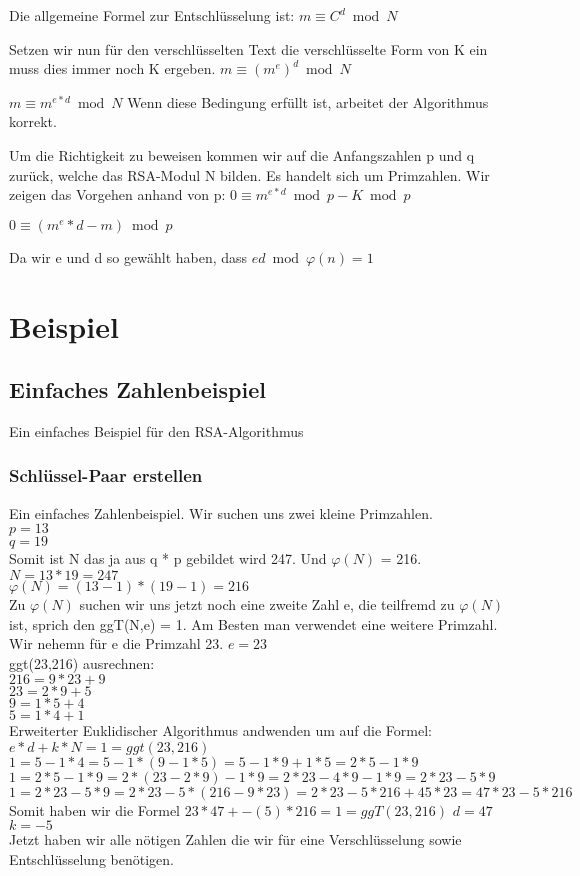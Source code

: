 
Die allgemeine Formel zur Entschlüsselung ist:
$ m \equiv C^d \bmod N $

Setzen wir nun für den verschlüsselten Text die verschlüsselte Form von K ein muss dies immer noch K ergeben.
$ m \equiv (m^e)^d \bmod N $

$ m \equiv m^{e*d} \bmod N $
Wenn diese Bedingung erfüllt ist, arbeitet der Algorithmus korrekt.

Um die Richtigkeit zu beweisen kommen wir auf die Anfangszahlen p und q zurück, welche das RSA-Modul N bilden. Es handelt sich um Primzahlen. Wir zeigen das Vorgehen anhand von p:
$ 0 \equiv m^{e*d} \bmod p - K \bmod p $

$ 0 \equiv (m^e*d-m) \bmod p $

Da wir e und d so gewählt haben, dass 
$ ed \bmod \varphi(n) = 1 $ 


\section{Beispiel}
\subsection{Einfaches Zahlenbeispiel}
Ein einfaches Beispiel für den RSA-Algorithmus
\subsubsection{Schlüssel-Paar erstellen}
Ein einfaches Zahlenbeispiel. Wir suchen uns zwei kleine Primzahlen.\\
$ p = 13 $ \\
$ q = 19 $ \\
Somit ist N das ja aus q * p gebildet wird 247. Und $ \varphi(N) $ = 216.\\
$ N = 13 * 19 = 247 $ \\
$ \varphi(N) = (13 - 1) * (19 - 1) = 216 $ \\
Zu $ \varphi(N) $ suchen wir uns jetzt noch eine zweite Zahl e, die teilfremd zu $ \varphi(N) $ ist, sprich den ggT(N,e) = 1. Am Besten man verwendet eine weitere Primzahl. Wir nehemn für e die Primzahl 23.
$ e = 23 $\\
ggt(23,216) ausrechnen:\\
$ 216 = 9 * 23 + 9 $\\
$  23 = 2 *  9 + 5 $\\
$   9 = 1 *  5 + 4 $\\
$   5 = 1 *  4 + 1 $\\
Erweiterter Euklidischer Algorithmus andwenden um auf die Formel:
$e * d + k * N = 1 = ggt(23,216) $\\
$1 = 5 - 1 * 4 = 5 - 1 *(9 - 1 * 5) = 5 - 1*9 + 1 * 5 = 2*5 - 1*9$\\
$1 = 2*5 - 1*9 = 2 *(23 - 2 * 9) - 1*9 = 2*23 - 4*9 - 1*9 = 2*23 - 5*9$\\
$1 = 2*23 - 5*9=2*23 - 5 *(216 - 9 * 23) = 2*23 - 5*216 +45*23 = 47*23 - 5*216 $\\
Somit haben wir die Formel
$ 23 * 47 + -(5) * 216 = 1 = ggT(23,216) $
$ d = 47 $\\
$ k = -5 $\\
Jetzt haben wir alle nötigen Zahlen die wir für eine Verschlüsselung sowie Entschlüsselung benötigen.
